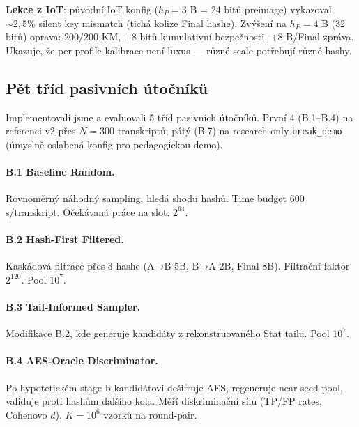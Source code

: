 \documentclass[11pt,a4paper]{article}
\begin{document}
\textbf{Lekce z IoT}: původní IoT konfig ($h_P = 3$ B = 24 bitů preimage) vykazoval $\sim 2{,}5\%$ silent key mismatch (tichá kolize Final hashe). Zvýšení na $h_P = 4$ B (32 bitů) oprava: $200/200$ KM, +8 bitů kumulativní bezpečnosti, +8 B/Final zpráva. Ukazuje, že per-profile kalibrace není luxus --- různé scale potřebují různé hashy.

\subsection{Pět tříd pasivních útočníků}\label{pop:exp-attackers}

Implementovali jsme a evaluovali 5 tříd pasivních útočníků. První 4 (B.1--B.4) na referenci v2 přes $N = 300$ transkriptů; pátý (B.7) na research-only \texttt{break\_demo} (úmyslně oslabená konfig pro pedagogickou demo).

\paragraph{B.1 Baseline Random.} Rovnoměrný náhodný sampling, hledá shodu hashů. Time budget 600 s/transkript. Očekávaná práce na slot: $2^{64}$.

\paragraph{B.2 Hash-First Filtered.} Kaskádová filtrace přes 3 hashe (A→B 5B, B→A 2B, Final 8B). Filtrační faktor $2^{120}$. Pool $10^7$.

\paragraph{B.3 Tail-Informed Sampler.} Modifikace B.2, kde generuje kandidáty z rekonstruovaného Stat tailu. Pool $10^7$.

\paragraph{B.4 AES-Oracle Discriminator.} Po hypotetickém stage-b kandidátovi dešifruje AES, regeneruje near-seed pool, validuje proti hashům dalšího kola. Měří diskriminační sílu (TP/FP rates, Cohenovo $d$). $K = 10^6$ vzorků na round-pair.
\end{document}
